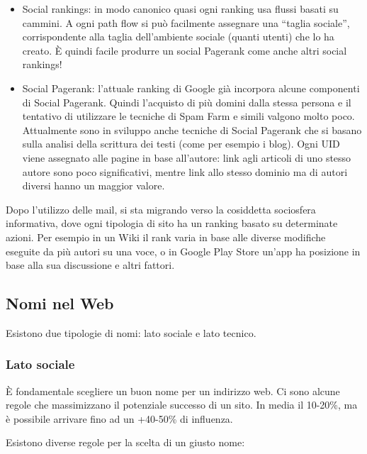 \begin{itemize}

\item Social rankings: in modo canonico quasi ogni ranking usa flussi basati su cammini. A ogni path flow si pu\`o facilmente assegnare una ``taglia sociale'', corrispondente alla taglia dell'ambiente sociale (quanti utenti) che lo ha creato. \`E quindi facile produrre un social Pagerank come anche altri social rankings!

\item Social Pagerank: l'attuale ranking di Google gi\`a incorpora alcune componenti di Social Pagerank. Quindi l'acquisto di pi\`u domini dalla stessa persona e il tentativo di utilizzare le tecniche di Spam Farm e simili valgono molto poco. Attualmente sono in sviluppo anche tecniche di Social Pagerank che si basano sulla analisi della scrittura dei testi (come per esempio i blog). Ogni UID viene assegnato alle pagine in base all'autore: link agli articoli di uno stesso autore sono poco significativi, mentre link allo stesso dominio ma di autori diversi hanno un maggior valore.

\end{itemize}

Dopo l'utilizzo delle mail, si sta migrando verso la cosiddetta sociosfera informativa, dove ogni tipologia di sito ha un ranking basato su determinate azioni. Per esempio in un Wiki il rank varia in base alle diverse modifiche eseguite da pi\`u autori su una voce, o in Google Play Store un'app ha posizione in base alla sua discussione e altri fattori.

\subsection{Nomi nel Web}

Esistono due tipologie di nomi: lato sociale e lato tecnico.

\subsubsection{Lato sociale}

\`E fondamentale scegliere un buon nome per un indirizzo web. Ci sono alcune regole che massimizzano il potenziale successo di un sito. In media il 10-20\%, ma \`e possibile arrivare fino ad un +40-50\% di influenza.

Esistono diverse regole per la scelta di un giusto nome:

